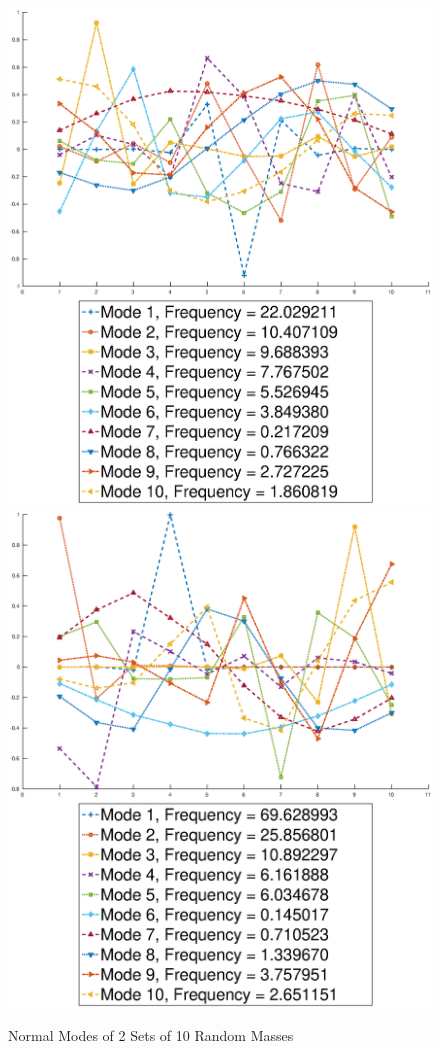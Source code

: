 \documentclass[10pt,a4paper]{article}
\begin{document}
\begin{multicols*}{2}
\begin{figure}[H]
	\centering
	\includegraphics[width=\columnwidth]{figures/random10_1.eps}
	\includegraphics[width=\columnwidth]{figures/random10_2.eps}
	\caption{Normal Modes of 2 Sets of 10 Random Masses}
	\label{fig: random10}
\end{figure}


\end{multicols*}
\end{document}
